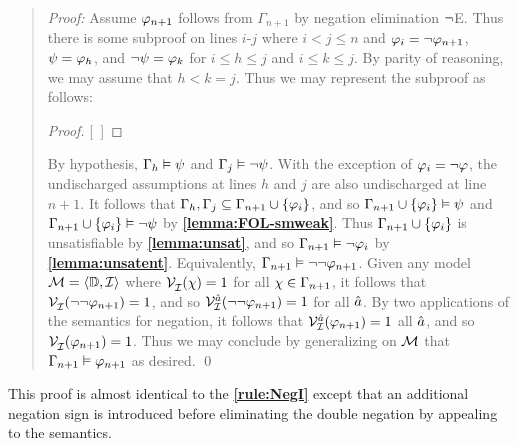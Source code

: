 \begin{quote} 
  \textit{Proof:} Assume $\varphi_{n+1}$ follows from $\Gamma_{n+1}$ by negation elimination $\neg$E.
  Thus there is some subproof on lines $i$-$j$ where $i<j\leq n$ and $\varphi_i=\neg\varphi_{n+1}$, $\psi=\varphi_h$, and $\neg\psi=\varphi_k$ for $i\leq h\leq j$ and $i\leq k\leq j$.
  By parity of reasoning, we may assume that $h<k=j$.
  Thus we may represent the subproof as follows:

  \begin{proof}
  \open
     
  \close
  [\ ]{\metaA} %
  \end{proof}

  By hypothesis, $\Gamma_h \vDash \psi$ and $\Gamma_j \vDash \neg\psi$.
  With the exception of $\varphi_i=\neg\varphi$, the undischarged assumptions at lines $h$ and $j$ are also undischarged at line $n+1$.
  It follows that $\Gamma_h,\Gamma_j\subseteq\Gamma_{n+1}\cup\lbrace\varphi_i\rbrace$, and so $\Gamma_{n+1}\cup\lbrace\varphi_i\rbrace \vDash \psi$ and $\Gamma_{n+1}\cup\lbrace\varphi_i\rbrace \vDash \neg\psi$ by \textbf{\ref{lemma:FOL-smweak}}.
  Thus $\Gamma_{n+1}\cup\lbrace\varphi_i\rbrace$ is unsatisfiable by \textbf{\ref{lemma:unsat}}, and so $\Gamma_{n+1} \vDash \neg\varphi_i$ by \textbf{\ref{lemma:unsatent}}.
  Equivalently, $\Gamma_{n+1} \vDash \neg\neg\varphi_{n+1}$.
  Given any model $\mathcal{M}=\langle\mathbb{D},\mathcal{I}\rangle$ where $\mathcal{V}_{\mathcal{I}}^{}(\chi) = 1$ for all $\chi \in \Gamma_{n+1}$, it follows that $\mathcal{V}_{\mathcal{I}}^{}(\neg\neg\varphi_{n+1}) = 1$, and so $\mathcal{V}_{\mathcal{I}}^{\hat{a}}(\neg\neg\varphi_{n+1})=1$ for all $\hat{a}$. 
  By two applications of the semantics for negation, it follows that $\mathcal{V}_{\mathcal{I}}^{\hat{a}}(\varphi_{n+1})=1$ all $\hat{a}$, and so $\mathcal{V}_{\mathcal{I}}^{}(\varphi_{n+1}) = 1$.
  Thus we may conclude by generalizing on $\mathcal{M}$ that $\Gamma_{n+1} \vDash \varphi_{n+1}$ as desired.
  \qed
\end{quote}

This proof is almost identical to the \textbf{\ref{rule:NegI}} except that an additional negation sign is introduced before eliminating the double negation by appealing to the semantics.

